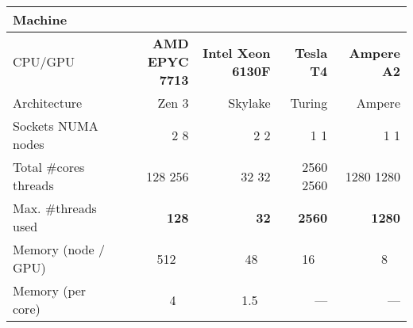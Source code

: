 \setlength{\tabcolsep}{4pt}
\begin{center}
	\begin{adjustbox}{max width=\textwidth, max height=\textheight}
		\begin{tabular}{lrrrr}
			\toprule
			Machine                                                 & \machvsclong                    & \machhydralong                  & \machteslalong            & \machamperelong            \\
			\midrule
			CPU/GPU                                                 & \textbf{AMD EPYC 7713}          & \textbf{Intel Xeon 6130F}       & \textbf{\nvidia Tesla T4} & \textbf{\nvidia Ampere A2} \\
			Architecture                                            & Zen 3                           & Skylake                         & Turing                    & Ampere                     \\
			Sockets \textbar{} NUMA nodes                           & 2 \textbar{} 8                  & 2 \textbar{} 2                  & 1 \textbar{} 1            & 1 \textbar{} 1             \\
			Total \#cores \textbar{} threads                        & 128 \textbar{} 256              & 32 \textbar{} 32                & 2560 \textbar{} 2560      & 1280 \textbar{} 1280       \\
			Max. \#threads used                                     & \textbf{128}                    & \textbf{32}                     & \textbf{2560}             & \textbf{1280}              \\
			Memory (node / GPU)                                     & \qty{512}{\gibi\byte}           & \qty{48}{\gibi\byte}            & \qty{16}{\gibi\byte}      & \qty{8}{\gibi\byte}        \\
			Memory (per core)                                       & \qty{4}{\gibi\byte}             & \qty{1.5}{\gibi\byte}           & —                         & —                          \\

\end{tabular}
\end{adjustbox}
\end{center}
